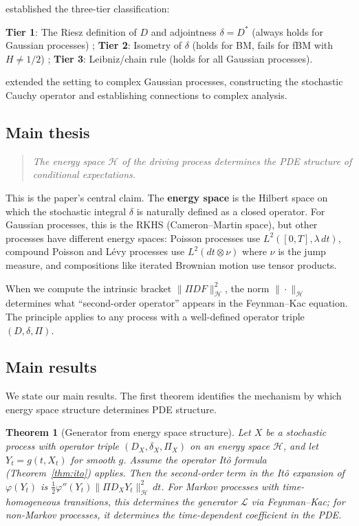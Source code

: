 \documentclass[11pt]{article}
\newtheorem{theorem}{Theorem}[section]
\theoremstyle{definition}
\newcommand{\Hi}{\mathcal{H}}
\begin{document}
\cite{PaperIV} established the three-tier classification:

\textbf{Tier 1}: The Riesz definition of $D$ and adjointness $\delta = D^*$ (always holds for Gaussian processes) ; \textbf{Tier 2}: Isometry of $\delta$ (holds for BM, fails for fBM with $H \neq 1/2$) ; \textbf{Tier 3}: Leibniz/chain rule (holds for all Gaussian processes).

\cite{PaperV} extended the setting to complex Gaussian processes, constructing the stochastic Cauchy operator and establishing connections to complex analysis.

\subsection{Main thesis}

\begin{quote}
\textit{The energy space $\Hi$ of the driving process determines the PDE structure of conditional expectations.}
\end{quote}

This is the paper's central claim. The \textbf{energy space} is the Hilbert space on which the stochastic integral $\delta$ is naturally defined as a closed operator. For Gaussian processes, this is the RKHS (Cameron--Martin space), but other processes have different energy spaces: Poisson processes use $L^2([0,T], \lambda\,dt)$, compound Poisson and L\'evy processes use $L^2(dt \otimes \nu)$ where $\nu$ is the jump measure, and compositions like iterated Brownian motion use tensor products.

When we compute the intrinsic bracket $\|\Pi D F\|^2_\Hi$, the norm $\|\cdot\|_\Hi$ determines what ``second-order operator'' appears in the Feynman--Kac equation. The principle applies to any process with a well-defined operator triple $(D, \delta, \Pi)$.

\subsection{Main results}

We state our main results. The first theorem identifies the mechanism by which energy space structure determines PDE structure.

\begin{theorem}[Generator from energy space structure]\label{thm:main-principle}
Let $X$ be a stochastic process with operator triple $(D_X, \delta_X, \Pi_X)$ on an energy space $\Hi$, and let $Y_t = g(t, X_t)$ for smooth $g$. Assume the operator It\^o formula (Theorem~\ref{thm:ito}) applies. Then the second-order term in the It\^o expansion of $\varphi(Y_t)$ is $\frac{1}{2}\varphi''(Y_t) \|\Pi D_X Y_t\|^2_\Hi \, dt$. For Markov processes with time-homogeneous transitions, this determines the generator $\mathcal{L}$ via Feynman--Kac; for non-Markov processes, it determines the time-dependent coefficient in the PDE.
\end{theorem}
\end{document}
